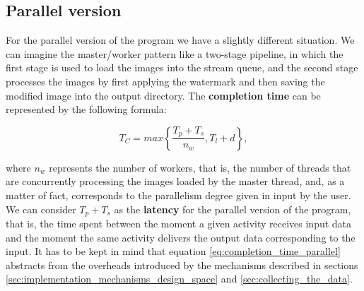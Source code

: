         \subsection{Parallel version} %
        \label{sub:parallel_version}
            For the parallel version of the program we have a slightly different situation. We can imagine the
            master/worker pattern like a two-stage pipeline, in which the first stage is used to load the images
            into the stream queue, and the second stage processes the images by first applying the watermark and
            then saving the modified image into the output directory. The \textbf{completion time} can be
            represented by the following formula:

            \begin{equation}
                T_C = \mathit{max} \left \{ \frac{T_p + T_s}{n_w}, T_l + d \right \},
                \label{eq:completion_time_parallel}
            \end{equation}

            where $n_w$ represents the number of workers, that is, the number of threads that are concurrently
            processing the images loaded by the master thread, and, as a mat{}ter of fact, corresponds to the
            parallelism degree given in input by the user. We can consider $T_p + T_s$ as the \textbf{latency}
            for the parallel version of the program, that is, the time spent between the moment a given
            activity receives input data and the moment the same activity delivers the output data
            corresponding to the input. It has to be kept in mind that equation
            \ref{eq:completion_time_parallel} abstracts from the overheads introduced by the
            mechanisms described in sections \ref{sec:implementation_mechanisms_design_space} and
            \ref{sec:collecting_the_data}.

